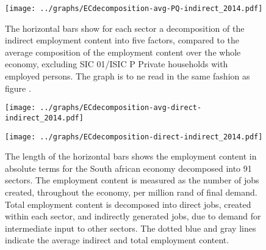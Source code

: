 \documentclass[12pt,english]{article}
\begin{document}
\begin{figure}[!ht]
	\centering
	\texttt{[image: ../graphs/ECdecomposition-avg-PQ-indirect\_2014.pdf]}
	\caption{\footnotesize \label{Decomposition_PQ_indirect}The horizontal bars show for each sector a decomposition of the indirect employment content into five factors, compared to the average composition of the employment content over the whole economy, excluding SIC 01/ISIC P Private households with employed persons. The graph is to ne read in the same fashion as figure \label{Decomposition_PQ}. %
	}
\end{figure}


\begin{figure}[!ht]
	\centering
	\thispagestyle{empty}
		\texttt{[image: ../graphs/ECdecomposition-avg-direct-indirect\_2014.pdf]}
	\caption{\label{Decomposition_direct_indirect_avg}}
\end{figure}	



\begin{figure}[!ht]
	\centering
	\thispagestyle{empty}
		\texttt{[image: ../graphs/ECdecomposition-direct-indirect\_2014.pdf]}
	\caption{\label{Decomposition_direct_indirect_absolute} The length of the horizontal bars shows the employment content in absolute terms for the South african economy decomposed into 91 sectors. The employment content is measured as the number of jobs created, throughout the economy, per million rand of final demand. Total employment content is decomposed into direct jobs, created within each sector, and indirectly generated jobs, due to demand for intermediate input to other sectors. The dotted blue and gray lines indicate the average indirect and total employment content.}
\end{figure}	
\end{document}
